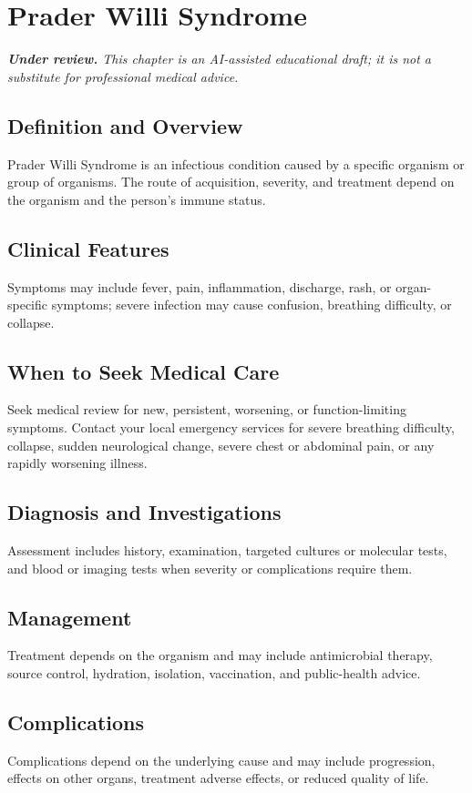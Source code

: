 \chapter{Prader Willi Syndrome}

\medskip
\noindent\textit{\textbf{Under review.} This chapter is an AI-assisted educational draft; it is not a substitute for professional medical advice.}

\section*{Definition and Overview}
Prader Willi Syndrome is an infectious condition caused by a specific organism or group of organisms. The route of acquisition, severity, and treatment depend on the organism and the person's immune status.

\section*{Clinical Features}
Symptoms may include fever, pain, inflammation, discharge, rash, or organ-specific symptoms; severe infection may cause confusion, breathing difficulty, or collapse.

\section*{When to Seek Medical Care}
Seek medical review for new, persistent, worsening, or function-limiting symptoms. Contact your local emergency services for severe breathing difficulty, collapse, sudden neurological change, severe chest or abdominal pain, or any rapidly worsening illness.

\section*{Diagnosis and Investigations}
Assessment includes history, examination, targeted cultures or molecular tests, and blood or imaging tests when severity or complications require them.

\section*{Management}
Treatment depends on the organism and may include antimicrobial therapy, source control, hydration, isolation, vaccination, and public-health advice.

\section*{Complications}
Complications depend on the underlying cause and may include progression, effects on other organs, treatment adverse effects, or reduced quality of life.

